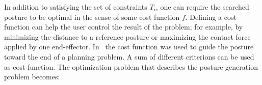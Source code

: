 In addition to satisfying the set of constraints $T_i$, one can require the searched posture to be optimal in the sense of some cost function $f$.
Defining a cost function can help the user control the result of the problem; for example, by minimizing the distance to a reference posture or maximizing the contact force applied by one end-effector.
In~\cite{escande2009} the cost function was used to guide the posture toward the end of a planning problem.
A sum of different criterions can be used as cost function.
The optimization problem that describes the posture generation problem becomes:









